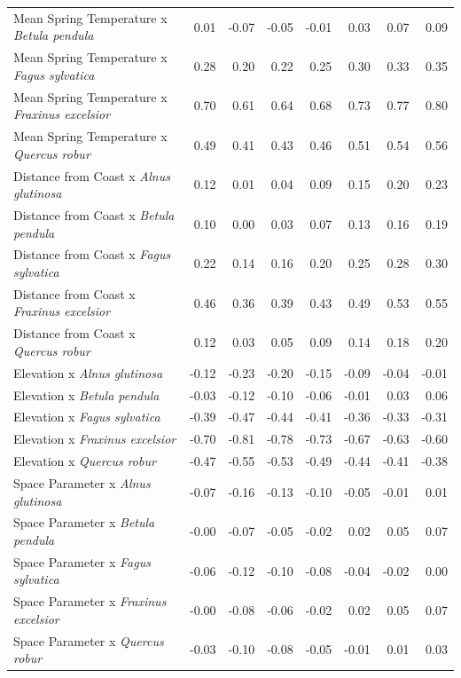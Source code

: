 \documentclass{article}\usepackage[]{graphicx}\usepackage[]{color}
\begin{document}
\begin{longtable}{lrrrrrrr}
  Mean Spring 
Temperature
x\textit{ Betula pendula} & 0.01 & -0.07 & -0.05 & -0.01 & 0.03 & 0.07 & 0.09 \\ 
  Mean Spring 
Temperature
x\textit{ Fagus sylvatica} & 0.28 & 0.20 & 0.22 & 0.25 & 0.30 & 0.33 & 0.35 \\ 
  Mean Spring 
Temperature
x\textit{ Fraxinus excelsior} & 0.70 & 0.61 & 0.64 & 0.68 & 0.73 & 0.77 & 0.80 \\ 
  Mean Spring 
Temperature
x\textit{ Quercus robur} & 0.49 & 0.41 & 0.43 & 0.46 & 0.51 & 0.54 & 0.56 \\ 
  Distance from 
Coast
x\textit{ Alnus glutinosa} & 0.12 & 0.01 & 0.04 & 0.09 & 0.15 & 0.20 & 0.23 \\ 
  Distance from 
Coast
x\textit{ Betula pendula} & 0.10 & 0.00 & 0.03 & 0.07 & 0.13 & 0.16 & 0.19 \\ 
  Distance from 
Coast
x\textit{ Fagus sylvatica} & 0.22 & 0.14 & 0.16 & 0.20 & 0.25 & 0.28 & 0.30 \\ 
  Distance from 
Coast
x\textit{ Fraxinus excelsior} & 0.46 & 0.36 & 0.39 & 0.43 & 0.49 & 0.53 & 0.55 \\ 
  Distance from 
Coast
x\textit{ Quercus robur} & 0.12 & 0.03 & 0.05 & 0.09 & 0.14 & 0.18 & 0.20 \\ 
  Elevation
x\textit{ Alnus glutinosa} & -0.12 & -0.23 & -0.20 & -0.15 & -0.09 & -0.04 & -0.01 \\ 
  Elevation
x\textit{ Betula pendula} & -0.03 & -0.12 & -0.10 & -0.06 & -0.01 & 0.03 & 0.06 \\ 
  Elevation
x\textit{ Fagus sylvatica} & -0.39 & -0.47 & -0.44 & -0.41 & -0.36 & -0.33 & -0.31 \\ 
  Elevation
x\textit{ Fraxinus excelsior} & -0.70 & -0.81 & -0.78 & -0.73 & -0.67 & -0.63 & -0.60 \\ 
  Elevation
x\textit{ Quercus robur} & -0.47 & -0.55 & -0.53 & -0.49 & -0.44 & -0.41 & -0.38 \\ 
  Space Parameter
x\textit{ Alnus glutinosa} & -0.07 & -0.16 & -0.13 & -0.10 & -0.05 & -0.01 & 0.01 \\ 
  Space Parameter
x\textit{ Betula pendula} & -0.00 & -0.07 & -0.05 & -0.02 & 0.02 & 0.05 & 0.07 \\ 
  Space Parameter
x\textit{ Fagus sylvatica} & -0.06 & -0.12 & -0.10 & -0.08 & -0.04 & -0.02 & 0.00 \\ 
  Space Parameter
x\textit{ Fraxinus excelsior} & -0.00 & -0.08 & -0.06 & -0.02 & 0.02 & 0.05 & 0.07 \\ 
  Space Parameter
x\textit{ Quercus robur} & -0.03 & -0.10 & -0.08 & -0.05 & -0.01 & 0.01 & 0.03 \\ 

\end{longtable}
\end{document}
